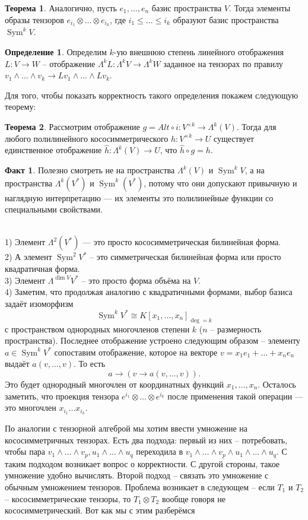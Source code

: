 \documentclass[10pt,a4paper,oneside]{book}
\theoremstyle{definition}
\newtheorem*{defn}{{\color{yellow!20!red} Определение}}
\newtheorem*{fact}{Факт}
\newtheorem{thm}{{\color{red!40!black} Теорема}}
\newcommand{\Sym}{\operatorname{Sym}}
\def\exm{\noindent {\bf Примеры:}}
\def\thrm{\begin{thm}}
\def\ethrm{\end{thm}}
\def\dfn{\begin{defn}}
\def\edfn{\end{defn}}
\def\fct{\begin{fact}}
\def\efct{\end{fact}}
\begin{document}
\thrm Аналогично, пусть $e_1,\dots, e_n$ базис пространства $V$. Тогда элементы образы тензоров $e_{i_1}\otimes \dots \otimes e_{i_k}$, где $i_1\leq \dots \leq i_k$ образуют базис пространства $\Sym^k V$.
\ethrm

\dfn Определим $k$-ую внешнюю степень линейного отображения $L\colon V \to W$ -- отображение $\Lambda^{k} L  \colon \Lambda^k V \to \Lambda^k W$ заданное на тензорах по правилу $v_1\wedge \dots \wedge v_k \to L v_1 \wedge \dots \wedge L v_k$. 
\edfn

Для того, чтобы показать корректность такого определения покажем следующую теорему:

\thrm Рассмотрим отображение $g=Alt \circ i \colon V^{\times k} \to \Lambda^k(V)$. Тогда для любого полилинейного кососимметрического $h \colon V^{\times k} \to U$ существует единственное отображение $\hat{h} \colon \Lambda^k(V) \to U$, что $\hat{h} \circ g = h$.
\ethrm


\fct Полезно смотреть не на пространства $\Lambda^k (V)$ и $\Sym^k V$, а на пространства $\Lambda^k(V^*)$ и $\Sym^k(V^*)$, потому что они допускают привычную и наглядную интерпретацию --- их элементы это полилинейные функции со специальными свойствами.
\efct


\exm \\
1) Элемент $\Lambda^2(V^*)$ --- это просто кососимметрическая билинейная форма.\\
2) А элемент $\Sym^2 V^*$ -- это симметрическая билинейная форма или просто квадратичная форма.\\
3) Элемент $\Lambda^{\dim V} V^*$ -- это просто форма объёма на $V$.\\
4) Заметим, что продолжая аналогию с квадратичными формами, выбор базиса задаёт изоморфизм 
$$\Sym^k V^* \cong K[x_1,\dots, x_n]_{\deg =k}$$
с пространством однородных многочленов степени $k$ ($n$ -- размерность пространства). Последнее отображение устроено следующим образом -- элементу $a \in \Sym^k V^* $ сопоставим отображение, которое на векторе $v=x_1e_1+\dots+x_ne_n $ выдаёт $a(v,\dots,v)$. То есть 
$$a \to (v \to a(v,\dots,v)).$$
 Это будет однородный многочлен от координатных функций $x_1, \dots, x_n$. Осталось заметить, что проекция тензора $e^{i_1}\otimes \dots \otimes e^{i_k}$ после применения такой операции --- это многочлен $x_{i_1}\dots x_{i_k}$.
 
По аналогии с тензорной алгеброй мы хотим ввести умножение на кососимметричных тензорах. Есть два подхода: первый из них -- потребовать, чтобы пара $v_1 \wedge \dots \wedge v_p , u_1\wedge \dots \wedge u_q$ переходила в $v_1 \wedge \dots \wedge v_p \wedge u_1\wedge \dots \wedge u_q$. С таким подходом возникает вопрос о корректности. С другой стороны, такое умножение удобно вычислять. Второй подход -- связать это умножение с обычным умножением тензоров. Проблема возникает в следующем -- если $T_1$ и $T_2$ -- кососимметрические тензоры, то $T_1\otimes T_2$ вообще говоря не кососимметрический. Вот как мы с этим разберёмся
\end{document}
